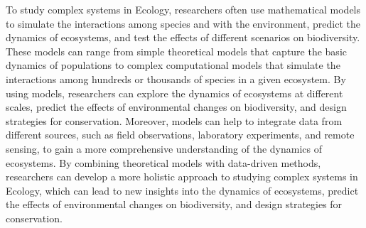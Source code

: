 
To study complex systems in Ecology, researchers often use mathematical models
to simulate the interactions among species and with the environment, predict
the dynamics of ecosystems, and test the effects of different scenarios on
biodiversity. These models can range from simple theoretical models that
capture the basic dynamics of populations to complex computational models that
simulate the interactions among hundreds or thousands of species in a given
ecosystem. By using models, researchers can explore the dynamics of ecosystems
at different scales, predict the effects of environmental changes on
biodiversity, and design strategies for conservation. Moreover, models can help
to integrate data from different sources, such as field observations,
laboratory experiments, and remote sensing, to gain a more comprehensive
understanding of the dynamics of ecosystems. By combining theoretical models
with data-driven methods, researchers can develop a more holistic approach to
studying complex systems in Ecology, which can lead to new insights into the
dynamics of ecosystems, predict the effects of environmental changes on
biodiversity, and design strategies for conservation.

